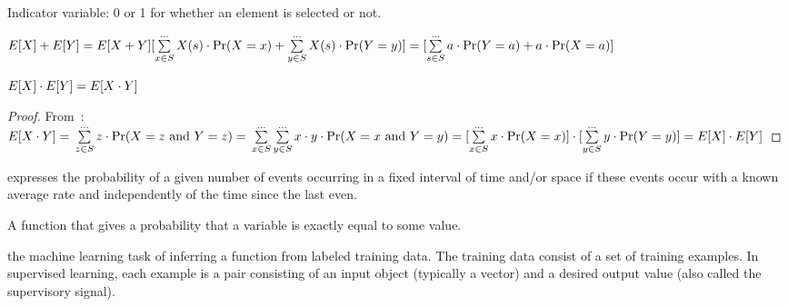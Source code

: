 \begin{definition}
    Indicator variable: 0 or 1 for whether an element is selected or not.
\end{definition}


\begin{definition}\label{lin_expect}
    $ E[X] + E[Y] = E[X + Y] \newline
    [\sum\limits_{x \in S}^{\dots} X(s) \cdot \Pr(X = x) +
    \sum\limits_{y \in S}^{\dots} X(s) \cdot \Pr(Y = y) ] \newline
    = [\sum\limits_{s \in S}^{\dots} a \cdot \Pr(Y = a) + a \cdot \Pr(X = a) ]
    $
\end{definition}

\begin{theorem}
    $ \newline E[X] \cdot E[Y] = E[X \cdot Y]$
\end{theorem}
\begin{proof}
    From~: \newline
    $
    E[X \cdot Y] = \newline \sum\limits_{z \in S}^{\dots} z \cdot 
        \Pr(X = z \text{ and } Y = z) = \newline
    \sum\limits_{x \in S}^{\dots}\sum\limits_{y \in S}^{\dots} x \cdot y
    \cdot \Pr(X = x \text{ and } Y=y) = \newline
    [\sum\limits_{x \in S}^{\dots} x \cdot \Pr(X = x)] \cdot  
    [\sum\limits_{y \in S}^{\dots} y \cdot \Pr(Y = y)]  = \newline
    E[X] \cdot E[Y]
    $
\end{proof}

\begin{definition}
    expresses the probability of a given number of events occurring in a fixed
    interval of time and/or space if these events occur with a known average
    rate and independently of the time since the last even.

\end{definition}

\begin{definition}
    A function that gives a probability that a variable is exactly equal to
    some value.
\end{definition}

\begin{definition}
    the machine learning task of inferring a function from labeled training
    data. The training data consist of a set of training examples. In
    supervised learning, each example is a pair consisting of an input object
    (typically a vector) and a desired output value (also called the
    supervisory signal).

\end{definition}
